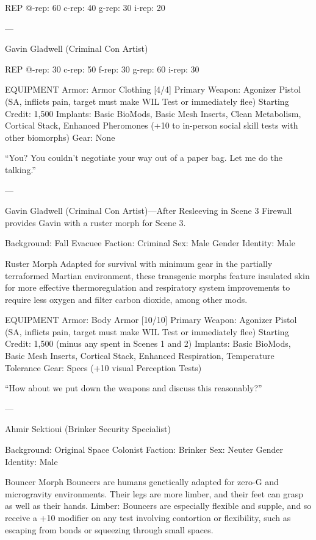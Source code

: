 ﻿%

   REP
   @-rep:	60
   c-rep:	40
   g-rep:	30
   i-rep:	20

---

Gavin Gladwell (Criminal Con Artist)

REP
@-rep:	30
c-rep:	50
f-rep:	30
g-rep:	60
i-rep:	30

EQUIPMENT
Armor: Armor Clothing [4/4]
Primary Weapon: Agonizer Pistol (SA, inflicts pain, target must make WIL Test or immediately flee)
Starting Credit: 1,500
Implants: Basic BioMods, Basic Mesh Inserts, Clean Metabolism, Cortical Stack, Enhanced Pheromones (+10 to in-person social skill tests with other biomorphs)
Gear: None

“You? You couldn't negotiate your way out of a paper bag. Let me do the talking.”

---

Gavin Gladwell (Criminal Con Artist)—After Resleeving in Scene 3
Firewall provides Gavin with a ruster morph for Scene 3.

Background: Fall Evacuee
Faction: Criminal
Sex: Male
Gender Identity: Male

Ruster Morph
Adapted for survival with minimum gear in the partially terraformed Martian environment, these transgenic morphs feature insulated skin for more effective thermoregulation and respiratory system improvements to require less oxygen and filter carbon dioxide, among other mods.

EQUIPMENT
Armor: Body Armor [10/10]
Primary Weapon: Agonizer Pistol (SA, inflicts pain, target must make WIL Test or immediately flee)
Starting Credit: 1,500 (minus any spent in Scenes 1 and 2)
Implants: Basic BioMods, Basic Mesh Inserts, Cortical Stack, Enhanced Respiration, Temperature Tolerance
Gear: Specs (+10 visual Perception Tests)

“How about we put down the weapons and discuss this reasonably?”

---

Ahmir Sektioui (Brinker Security Specialist)

Background: Original Space Colonist
Faction: Brinker
Sex: Neuter
Gender Identity: Male

Bouncer Morph
Bouncers are humans genetically adapted for zero-G and microgravity environments. Their legs are more limber, and their feet can grasp as well as their hands.
Limber: Bouncers are especially flexible and supple, and so receive a +10 modifier on any test involving contortion or flexibility, such as escaping from bonds or squeezing through small spaces.

